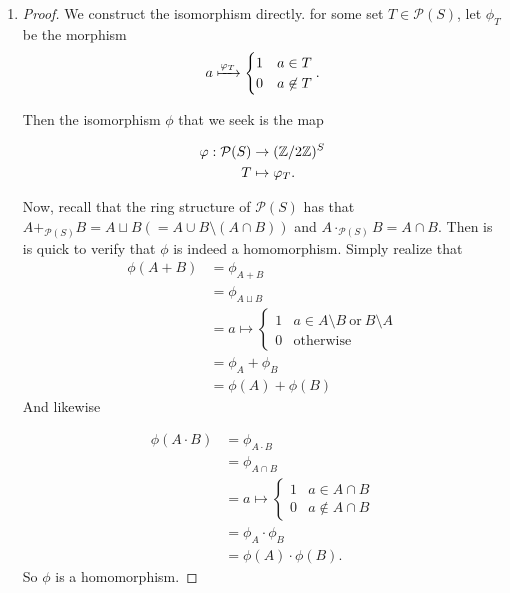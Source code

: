 \documentclass[12pt, twosided]{article}
\begin{document}
\begin{enumerate}
\item
  \begin{proof}
    We construct the isomorphism directly. for some set \(T \in \mathcal{P}(S) \), let \(\phi_T\) be the morphism
    \begin{align*}
      a \xmapsto{\phi_T} \begin{cases} 1 & a \in T \\ 0 & a \not\in T \end{cases}.
    \end{align*}

    Then the isomorphism \(\phi\) that we seek is the map

    \begin{align*}
      \phi: \mathcal{P}(S) &\to (\Z/2\Z)^S \\
      T &\mapsto \phi_T.
    \end{align*}

    Now, recall that the ring structure of \(\mathcal{P}(S)\) has that \(A +_{\mathcal{P}(S)} B = A \sqcup B (= A \cup B \setminus (A \cap B))\) and \(A \cdot_{\mathcal{P}(S)} B = A \cap B\). Then is is quick to verify that \(\phi\) is indeed a homomorphism. Simply realize that
    \begin{align*}
      \phi(A + B) &= \phi_{A + B} \\
                  &= \phi_{A \sqcup B} \\
                  &= a \mapsto \begin{cases} 1 & a \in A \setminus B \mathrm{\ or\ } B \setminus A \\ 0 & \mathrm{otherwise} \end{cases} \\
                  &= \phi_A + \phi_B \\
                  &= \phi(A) + \phi(B)
    \end{align*}
    And likewise

    \begin{align*}
      \phi(A \cdot B) &= \phi_{A \cdot B} \\
                      &= \phi_{A \cap B} \\
                      &= a \mapsto \begin{cases} 1 & a \in A \cap B \\ 0 & a \not\in A \cap B \end{cases} \\
                      &= \phi_A \cdot \phi_B \\
                      &= \phi(A) \cdot \phi(B).
    \end{align*}
    So \(\phi\) is a homomorphism. \partdone
    

\end{proof}
\end{enumerate}
\end{document}
